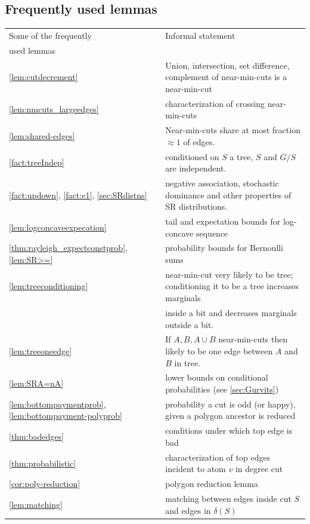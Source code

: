 {\subsection*{Frequently used lemmas}
\noindent
 \begin{tabular}{|l |l |} 
 \hline
Some of the frequently &  Informal statement \\ 
\quad\quad used lemmas  &\\
 \hline\hline
\cref{lem:cutdecrement} & Union, intersection, set difference, complement of near-min-cuts is a near-min-cut \\
\cref{lem:nmcuts_largeedges} & characterization of crossing near-min-cuts
 \\
\cref{lem:shared-edges} & Near-min-cuts share at most fraction $\approx 1$ of edges.
\\
\cref{fact:treeIndep} & conditioned on $S$ a tree, $S$ and $G /S$ are independent.
 \\ 
\cref{fact:updown}, \cref{fact:e1}, \cref{sec:SRdistns} & negative association, stochastic dominance and other properties of SR distributions.
\\
\cref{lem:logconcaveexpecation} & tail and expectation bounds for log-concave sequence\\
\cref{thm:rayleigh_expectconstprob}, \cref{lem:SR>=} & probability bounds for Bernoulli sums \\
\cref{lem:treeconditioning} & near-min-cut  very likely to be tree; conditioning it to be a tree increases marginals \\
&\quad\quad inside a bit and decreases marginals outside a bit. \\
\cref{lem:treeoneedge} & If $A, B, A\cup B$ near-min-cuts then  likely to be one edge between $A$ and $B$ in tree.\\
\cref{lem:SRA=nA} & lower bounds on conditional probabilities (see \cref{sec:Gurvits})\\
\cref{lem:bottompaymentprob}, \cref{lem:bottompayment-polyprob} & probability a cut is odd (or happy), given a polygon ancestor is reduced\\
\cref{thm:badedges} & conditions under which top edge is bad \\
\cref{thm:probabilistic} & characterization of top edges incident to atom $v$ in degree cut \\
\cref{cor:poly-reduction} & polygon reduction lemma \\
\cref{lem:matching} & matching between edges inside cut $S$ and edges in $\delta(S)$\\
 \hline
\end{tabular}


}
\vfill\eject
\fi 
